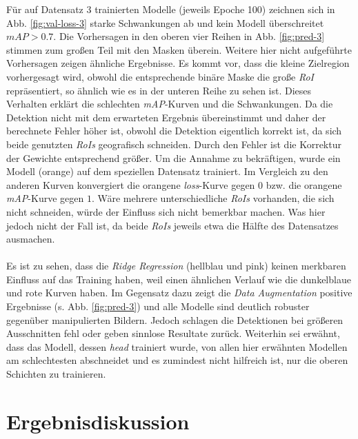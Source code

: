 Für auf Datensatz 3 trainierten Modelle (jeweils Epoche 100) zeichnen sich in  Abb. \ref{fig:val-loss-3} starke Schwankungen ab und kein Modell überschreitet $mAP>0.7$. Die Vorhersagen in den oberen vier Reihen in Abb. \ref{fig:pred-3} stimmen zum großen Teil mit den Masken überein. Weitere hier nicht aufgeführte Vorhersagen zeigen ähnliche Ergebnisse. Es kommt vor, dass die kleine Zielregion vorhergesagt wird, obwohl die entsprechende binäre Maske die große \textit{RoI} repräsentiert, so ähnlich wie es in der unteren Reihe zu sehen ist. Dieses Verhalten erklärt die schlechten \textit{mAP}-Kurven und die Schwankungen. Da die Detektion nicht mit dem erwarteten Ergebnis übereinstimmt und daher der berechnete Fehler höher ist, obwohl die Detektion eigentlich korrekt ist, da sich beide genutzten \textit{RoIs} geografisch schneiden. Durch den Fehler ist die Korrektur der Gewichte entsprechend größer. Um die Annahme zu bekräftigen, wurde ein Modell (orange) auf dem speziellen Datensatz trainiert. Im Vergleich zu den anderen Kurven konvergiert die orangene \textit{loss}-Kurve gegen $0$ bzw. die orangene \textit{mAP}-Kurve gegen $1$. Wäre mehrere unterschiedliche \textit{RoIs} vorhanden, die sich nicht schneiden, würde der Einfluss sich nicht bemerkbar machen. Was hier jedoch nicht der Fall ist, da beide \textit{RoIs} jeweils etwa die Hälfte des Datensatzes ausmachen.
\\\\
Es ist zu sehen, dass die \textit{Ridge Regression} (hellblau und pink) keinen merkbaren Einfluss auf das Training haben, weil einen ähnlichen Verlauf wie die dunkelblaue und rote Kurven haben. Im Gegensatz dazu zeigt die \textit{Data Augmentation} positive Ergebnisse (s. Abb. \ref{fig:pred-3}) und alle Modelle sind deutlich robuster gegenüber manipulierten Bildern. Jedoch schlagen die Detektionen bei größeren Ausschnitten fehl oder geben sinnlose Resultate zurück. Weiterhin sei erwähnt, dass das Modell, dessen \textit{head} trainiert wurde, von allen hier erwähnten Modellen am schlechtesten abschneidet und es zumindest nicht hilfreich ist, nur die oberen Schichten zu trainieren.

\section{Ergebnisdiskussion}


